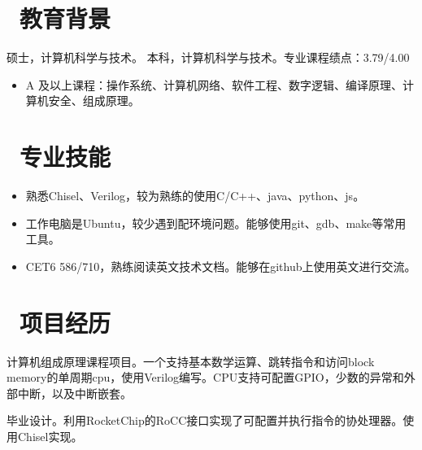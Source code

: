 \documentclass{resume}
\begin{document}



\section{\faGraduationCap\  教育背景}
硕士，计算机科学与技术。
本科，计算机科学与技术。专业课程绩点：3.79/4.00
\begin{itemize}[parsep=0.5ex]
  \item A 及以上课程：操作系统、计算机网络、软件工程、数字逻辑、编译原理、计算机安全、组成原理。
\end{itemize}

\section{\faBook\ 专业技能}
\begin{itemize}[parsep=0.5ex]
  \item 熟悉Chisel、Verilog，较为熟练的使用C/C++、java、python、js。
  \item 工作电脑是Ubuntu，较少遇到配环境问题。能够使用git、gdb、make等常用工具。
  \item CET6 586/710，熟练阅读英文技术文档。能够在github上使用英文进行交流。
\end{itemize}

\newcommand{\customtitle}[2]{\parbox[t]{#1}{\raggedright #2}}

\section{\faCogs\ 项目经历}
\begin{onehalfspacing}
  计算机组成原理课程项目。一个支持基本数学运算、跳转指令和访问block memory的单周期cpu，使用Verilog编写。CPU支持可配置GPIO，少数的异常和外部中断，以及中断嵌套。
\end{onehalfspacing}

\begin{onehalfspacing}
  毕业设计。利用RocketChip的RoCC接口实现了可配置并执行指令的协处理器。使用Chisel实现。
\end{onehalfspacing}
\end{document}
